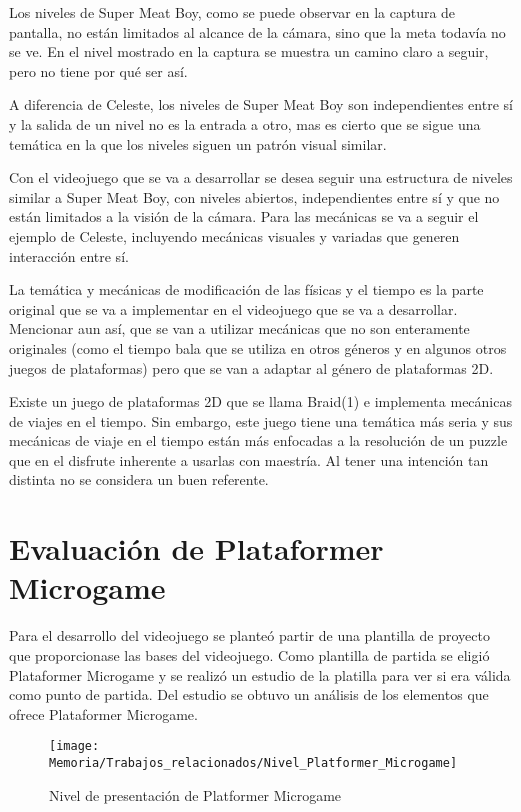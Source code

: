 Los niveles de Super Meat Boy, como se puede observar en la captura de pantalla, no están limitados al alcance de la cámara, sino que la meta todavía no se ve. En el nivel mostrado en la captura se muestra un camino claro a seguir, pero no tiene por qué ser así.

A diferencia de Celeste, los niveles de Super Meat Boy son independientes entre sí y la salida de un nivel no es la entrada a otro, mas es cierto que se sigue una temática en la que los niveles siguen un patrón visual similar. 

Con el videojuego que se va a desarrollar se desea seguir una estructura de niveles similar a Super Meat Boy, con niveles abiertos, independientes entre sí y que no están limitados a la visión de la cámara.
Para las mecánicas se va a seguir el ejemplo de Celeste, incluyendo mecánicas visuales y variadas que generen interacción entre sí.

La temática y mecánicas de modificación de las físicas y el tiempo es la parte original que se va a implementar en el videojuego que se va a desarrollar. Mencionar aun así, que se van a utilizar mecánicas que no son enteramente originales (como el tiempo bala que se utiliza en otros géneros y en algunos otros juegos de plataformas) pero que se van a adaptar al género de plataformas 2D.

Existe un juego de plataformas 2D que se llama Braid(1) e implementa mecánicas de viajes en el tiempo. Sin embargo, este juego tiene una temática más seria y sus mecánicas de viaje en el tiempo están más enfocadas a la resolución de un puzzle que en el disfrute inherente a usarlas con maestría. Al tener una intención tan distinta no se considera un buen referente.

\section{Evaluación de Plataformer Microgame}
Para el desarrollo del videojuego se planteó partir de una plantilla de proyecto que proporcionase las bases del videojuego. Como plantilla de partida se eligió Plataformer Microgame y se realizó un estudio de la platilla para ver si era válida como punto de partida. Del estudio se obtuvo un análisis de los elementos que ofrece Plataformer Microgame.

\begin{figure}[h]
\centering
\texttt{[image: Memoria/Trabajos\_relacionados/Nivel\_Platformer\_Microgame]}
\caption{Nivel de presentación de Platformer Microgame}
\end{figure}

